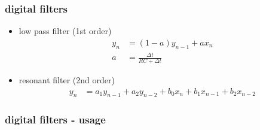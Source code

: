 \documentclass{beamer}
\begin{document}
\begin{frame}
  
  \frametitle{digital filters}

  \begin{itemize}

    \item low pass filter (1st order)
      \begin{align*}
        y_{n}&= (1 - a)y_{n-1} + a x_{n} \\
        a &= \frac{\Delta t}{RC + \Delta t}
      \end{align*}
  

    \item resonant filter (2nd order)
      \begin{align*}
        y_{n}&= a_{1}y_{n-1} + a_{2}y_{n-2} + b_{0}x_{n} + b_{1}x_{n-1} + b_{2}x_{n-2} 
      \end{align*}

  \end{itemize}

  
\end{frame}


\begin{frame}
  
  \frametitle{digital filters - usage}


\end{frame}
\end{document}
